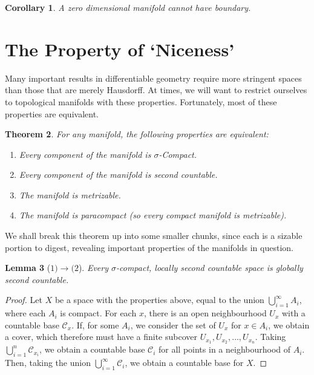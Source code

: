 \documentclass[12pt]{report}
\theoremstyle{plain}
\newtheorem{theorem}{Theorem}[chapter]
\newtheorem{lemma}[theorem]{Lemma}
\newtheorem{corollary}[theorem]{Corollary}
\theoremstyle{definition}
\begin{document}
\begin{corollary} A zero dimensional manifold cannot have boundary. \end{corollary}

\section{The Property of `Niceness'}

Many important results in differentiable geometry require more stringent spaces than those that are merely Hausdorff. At times, we will want to restrict ourselves to topological manifolds with these properties. Fortunately, most of these properties are equivalent.

\begin{theorem}
    For any manifold, the following properties are equivalent:
    \begin{enumerate}
        \item Every component of the manifold is $\sigma$-Compact.
        \item Every component of the manifold is second countable.
        \item The manifold is metrizable.
        \item The manifold is paracompact (so every compact manifold is metrizable).
    \end{enumerate}
\end{theorem}

We shall break this theorem up into some smaller chunks, since each is a sizable portion to digest, revealing important properties of the manifolds in question.

\begin{lemma}[$1) \to (2$]
    Every $\sigma$-compact, locally second countable space is globally second countable.
\end{lemma}
\begin{proof}
    Let $X$ be a space with the properties above, equal to the union $\bigcup_{i = 1}^\infty A_i$, where each $A_i$ is compact. For each $x$, there is an open neighbourhood $U_x$ with a countable base $\mathcal{C}_x$. If, for some $A_i$, we consider the set of $U_x$ for $x \in A_i$, we obtain a cover, which therefore must have a finite subcover $U_{x_1}, U_{x_2}, \dots, U_{x_n}$. Taking $\bigcup_{i = 1}^n \mathcal{C}_{x_i}$, we obtain a countable base $\mathcal{C}_i$ for all points in a neighbourhood of $A_i$. Then, taking the union $\bigcup_{i = 1}^\infty \mathcal{C}_i$, we obtain a countable base for $X$.
\end{proof}
\end{document}
